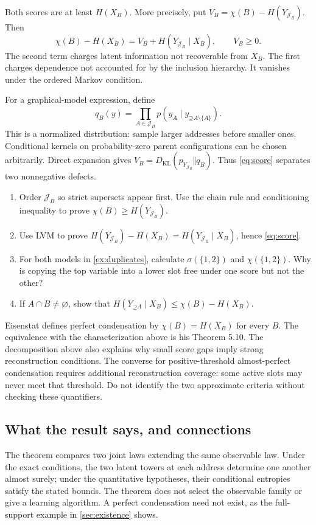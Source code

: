 \documentclass[11pt]{article}
\newcommand{\Up}{\mathord{\supseteq}}
\begin{document}
Both scores are at least $H(X_B)$. More precisely, put
$V_B=\chi(B)-H(Y_{\mathcal{J}_B})$. Then
\begin{equation}
 \chi(B)-H(X_B)=V_B+H(Y_{\mathcal{J}_B}\mid X_B),\qquad V_B\ge0.
 \label{eq:score}
\end{equation}
The second term charges latent information not recoverable from $X_B$.
The first charges dependence not accounted for by the inclusion hierarchy.
It vanishes under the ordered Markov condition.

For a graphical-model expression, define
\[
 q_B(y)=\prod_{A\in\mathcal{J}_B}
 p(y_A\mid y_{\Up A\setminus\{A\}}).
\]
This is a normalized distribution: sample larger addresses before smaller
ones. Conditional kernels on probability-zero parent configurations can be
chosen arbitrarily. Direct expansion gives
$V_B=D_{\mathrm{KL}}(p_{Y_{\mathcal{J}_B}}\Vert q_B)$.
Thus \eqref{eq:score} separates two nonnegative defects.

\begin{exercise}
\label{ex:scores}
\begin{enumerate}
\item Order $\mathcal{J}_B$ so strict supersets appear first. Use the chain rule
and conditioning inequality to prove $\chi(B)\ge H(Y_{\mathcal{J}_B})$.
\item Use LVM to prove
$H(Y_{\mathcal{J}_B})-H(X_B)=H(Y_{\mathcal{J}_B}\mid X_B)$, hence
\eqref{eq:score}.
\item For both models in \cref{ex:duplicates}, calculate $\sigma(\{1,2\})$ and
$\chi(\{1,2\})$. Why is copying the top variable into a lower slot free
under one score but not the other?
\item If $A\cap B\ne\varnothing$, show that
$H(Y_{\Up A}\mid X_B)\le\chi(B)-H(X_B)$.
\end{enumerate}
\end{exercise}

Eisenstat defines perfect condensation by $\chi(B)=H(X_B)$ for every $B$.
The equivalence with the characterization above is his Theorem 5.10.
The decomposition above also explains why small score gaps imply strong
reconstruction conditions. The converse for positive-threshold almost-perfect
condensation requires additional reconstruction coverage: some active slots
may never meet that threshold. Do not identify the two approximate criteria
without checking these quantifiers.

\subsection{What the result says, and connections}
\label{sec:meaning}
The theorem compares two joint laws extending the same observable law. Under
the exact conditions, the two latent towers at each address determine one
another almost surely; under the quantitative hypotheses, their conditional
entropies satisfy the stated bounds. The theorem does not select the observable
family or give a learning algorithm. A perfect condensation need not exist,
as the full-support example in \cref{sec:existence} shows.
\end{document}

